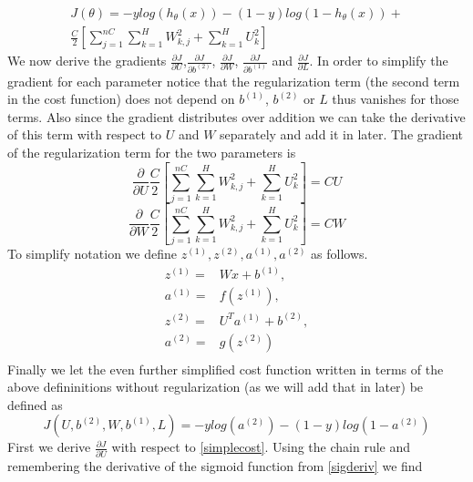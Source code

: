 \documentclass{article}
\begin{document}
\begin{equation}\label{cost}
\begin{split}
J(\theta) = -ylog(h_{\theta}(x))-(1-y)log(1-h_{\theta}(x))+\\ \frac{C}{2} \left[ \sum_{j=1}^{nC} \sum_{k=1}^H W_{k,j}^2 + \sum_{k=1}^H U_{k}^2\right]
\end{split}
\end{equation}
We now derive the gradients \(\frac{\partial J}{\partial U}\),\(\frac{\partial J}{\partial b^{(2)}}\), \(\frac{\partial J}{\partial W}\), \(\frac{\partial J}{\partial b^{(1)}}\) and \(\frac{\partial J}{\partial L}\).  In order to simplify the gradient for each parameter notice that the regularization term (the second term in the cost function) does not depend on \(b^{(1)}\), \(b^{(2)}\) or \(L\) thus vanishes for those terms.  Also since the gradient distributes over addition we can take the derivative of this term with respect to \(U\) and \(W\) separately and add it in later.  The gradient of the regularization term for the two parameters is
\begin{equation}\label{ureg}
\frac{\partial}{\partial U}\frac{C}{2} \left[ \sum_{j=1}^{nC} \sum_{k=1}^H W_{k,j}^2 + \sum_{k=1}^H U_{k}^2\right] = CU
\end{equation}
\begin{equation}\label{wreg}
\frac{\partial}{\partial W}\frac{C}{2} \left[ \sum_{j=1}^{nC} \sum_{k=1}^H W_{k,j}^2 + \sum_{k=1}^H U_{k}^2\right] = CW
\end{equation}
To simplify notation we define \( z^{(1)}, z^{(2)}, a^{(1)}, a^{(2)} \) as follows.
\begin{equation}
\begin{aligned}
z^{(1)} =& Wx + b^{(1)}, \\
a^{(1)} =& f(z^{(1)}), \\
z^{(2)} =& U^T a^{(1)} + b^{(2)}, \\
a^{(2)} =& g(z^{(2)}) \\
\end{aligned}
\end{equation}
Finally we let the even further simplified cost function written in terms of the above defininitions without regularization (as we will add that in later) be defined as
\begin{equation}\label{simplecost}
J(U,b^{(2)},W,b^{(1)},L) = -ylog(a^{(2)})-(1-y)log(1-a^{(2)})
\end{equation}
First we derive \(\frac{\partial J}{\partial U}\) with respect to \eqref{simplecost}.  Using the chain rule and remembering the derivative of the sigmoid function from \eqref{sigderiv} we find
\end{document}
